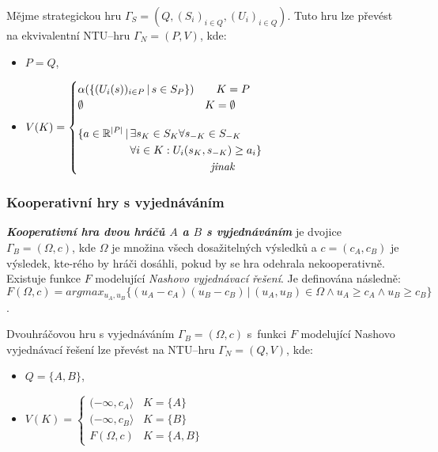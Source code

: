             Mějme strategickou hru $\Gamma_S = (Q, (S_i)_{i\in Q}, (U_i)_{i\in Q})$. Tuto hru lze převést na ekvivalentní NTU--hru $\Gamma_N = (P, V)$, kde:
            \begin{itemize}
                \item $P = Q$,
                \item $V(K) = \begin{cases}
                    \alpha(\{(U_i(s))_{i\in P}\,|\,s \in S_P\}) \hspace*{2em} K = P\\
                    \emptyset \hspace*{11em} K = \emptyset \\[1.2em]
                    \begin{aligned}
                        \{a \in \mathbb{R}^{|P|}\,|\,&\exists s_K \in S_K \forall s_{-K} \in S_{-K}\\
                        &\forall i \in K: U_i(s_K, s_{-K}) \geq a_i\}\\
                        &\hspace*{7.3em}\textit{jinak}
                    \end{aligned}
                \end{cases}$
            \end{itemize}

        \subsubsection*{Kooperativní hry s vyjednáváním}
            \textit{\textbf{Kooperativní hra dvou hráčů $A$ a $B$ s vyjednáváním}} \cite{Hruby2022} je dvojice $\Gamma_B = (\Omega, c)$, kde $\Omega$ je množina všech dosažitelných výsledků a $c = (c_A, c_B)$ je výsledek, kte-rého by hráči dosáhli, pokud by se hra odehrala nekooperativně.  Existuje funkce $F$ modelující \textit{Nashovo vyjednávací řešení}. Je definována následně: $F(\Omega, c) = arg max_{u_A, u_B}\{(u_A - c_A)(u_B - c_B)\,|\, (u_A, u_B) \in \Omega \land u_A \geq c_A \land u_B \geq c_B\}$.

            Dvouhráčovou hru s vyjednáváním $\Gamma_B = (\Omega, c)$ s~funkci $F$ modelující Nashovo vyjednávací řešení lze převést na NTU--hru $\Gamma_N = (Q, V)$, kde:

            \begin{itemize}
                \item $Q = \{A, B\}$,
                \item $V(K) = \begin{cases}
                    (-\infty, c_A\rangle & K = \{A\}\\
                    (-\infty, c_B\rangle & K = \{B\}\\
                    F(\Omega, c) & K = \{A, B\}
                \end{cases}$
            \end{itemize}
